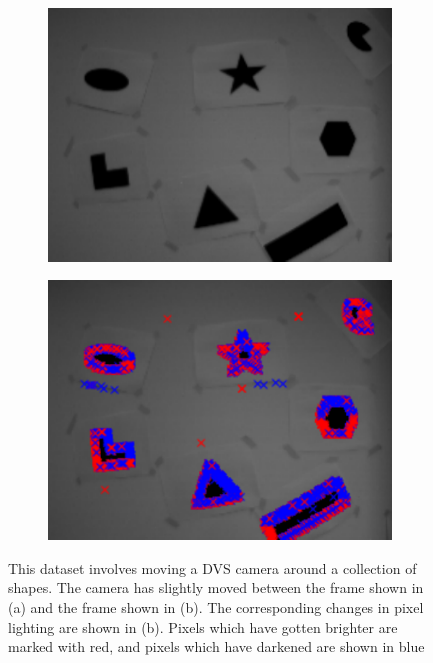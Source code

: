 \documentclass [MS] {UCLAthesis}
\begin{document}
\begin{figure}
     \centering
     \begin{subfigure}[b]{0.41\textwidth}
         \centering
         \includegraphics[width=\textwidth]{dvs1}
         \caption{}
         \label{fig:dvs1}
     \end{subfigure}
     \hfill
     \begin{subfigure}[b]{0.4\textwidth}
         \centering
         \includegraphics[width=\textwidth]{dvs2}
         \caption{}
         \label{fig:dvs2}
     \end{subfigure}
    \caption[Example data recorded from a DVS camera]{This dataset involves moving a DVS camera around a collection of shapes. The camera has slightly moved between the frame shown in (a) and the frame shown in (b). The corresponding changes in pixel lighting are shown in (b). Pixels which have gotten brighter are marked with red, and pixels which have darkened are shown in blue \cite{spiking_shapes}}
    \label{fig:dvs_ex}
\end{figure}
\end{document}
